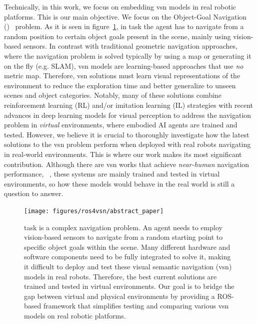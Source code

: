 Technically, in this work, we focus on embedding \acrshort{vsn} models in real robotic platforms.
This is our main objective.
We focus on the Object-Goal Navigation (\objnav)~\cite{batra2020} problem.
As it is seen in figure~\ref{fig:abstract_ros4vsn}, in \objnav task the agent has to navigate from a random position to certain object goals present in the scene, mainly using vision-based sensors.
In contrast with traditional geometric navigation approaches, where the navigation problem is solved typically by using a map or generating it on the fly (e.g. SLAM), \acrshort{vsn} models are learning-based approaches that use \emph{no} metric map.
Therefore, \acrshort{vsn} solutions must learn visual representations of the environment to reduce the exploration time and better generalize to unseen scenes and object categories.
Notably, many of these solutions combine reinforcement learning (RL) and/or imitation learning (IL) strategies with recent advances in deep learning models for visual perception to address the navigation problem in \emph{virtual} environments, where embodied AI agents are trained and tested.
However, we believe it is crucial to thoroughly investigate how the latest solutions to the \acrshort{vsn} problem perform when deployed with real robots navigating in real-world environments.
This is where our work makes its most significant contribution.
Although there are \acrshort{vsn} works that achieve \textit{near-human} navigation performance, \eg~\cite{ramrakhya2023}, these systems are mainly trained and tested in virtual environments, so how these models would behave in the real world is still a question to answer.

\begin{figure}[t]
    \centering
        \texttt{[image: figures/ros4vsn/abstract\_paper]}
        \caption{
        \objnav task is a complex navigation problem.
        An agent needs to employ vision-based sensors to navigate from a random starting point to specific object goals within the scene.
        Many different hardware and software components need to be fully integrated to solve it, making it difficult to deploy and test these visual semantic navigation (\acrshort{vsn}) models in real robots.
        Therefore, the best current solutions are trained and tested in virtual environments.
        Our goal is to bridge the gap between virtual and physical environments by providing a ROS-based framework that simplifies testing and comparing various \acrshort{vsn} models on real robotic platforms.
        }
        \label{fig:abstract_ros4vsn}
\end{figure}

